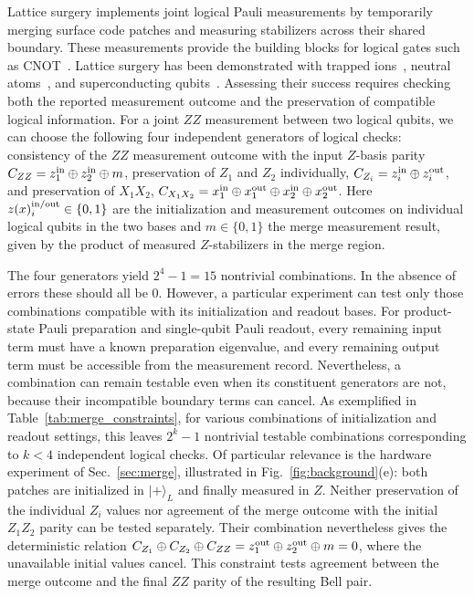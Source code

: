 \documentclass[aps,prxquantum,twocolumn,superscriptaddress,nofootinbib]{revtex4-2}
\begin{document}
Lattice surgery implements joint logical Pauli measurements by temporarily merging surface code patches and measuring stabilizers across their shared boundary. These measurements provide the building blocks for logical gates such as CNOT~\cite{horsman2012lattice,fowler2019lowoverheadquantumcomputation, Litinski_2018, Litinski_2019, bodeker2026lattice}. Lattice surgery has been demonstrated with trapped ions~\cite{erhard2021entangling,steiner2026genuine}, neutral atoms~\cite{bluvstein2025architectural}, and superconducting qubits~\cite{besedin2026lattice,lacroix2025color,wang2026surgery,lin2026logical}. Assessing their success requires checking both the reported measurement outcome and the preservation of compatible logical information. For a joint $ZZ$ measurement between two logical qubits, we can choose the following four independent generators of logical checks: consistency of the $ZZ$ measurement outcome with the input $Z$-basis parity $C_{ZZ}=z_1^{\rm in}\oplus z_2^{\rm in}\oplus m$, preservation of $Z_1$ and $Z_2$ individually, $C_{Z_i}=z_i^{\rm in}\oplus z_i^{\rm out}$, and preservation of $X_1X_2$, $C_{X_1X_2}=x_1^{\rm in}\oplus x_1^{\rm out}\oplus x_2^{\rm in}\oplus x_2^{\rm out}$. Here $z(x)_i^{\rm in/out}\in \{0,1\}$ are the initialization and measurement outcomes on individual logical qubits in the two bases and $m\in \{0,1\}$ the merge measurement result, given by the product of measured $Z$-stabilizers in the merge region. 

The four generators yield $2^4-1=15$ nontrivial combinations. In the absence of errors these should all be 0. However, a particular experiment can test only those combinations compatible with its initialization and readout bases.  For product-state Pauli preparation and single-qubit Pauli readout, every remaining input term must have a known preparation eigenvalue, and every remaining output term must be accessible from the measurement record. Nevertheless, a combination can remain testable even when its constituent generators are not, because their incompatible boundary terms can cancel. As exemplified in Table~\ref{tab:merge_constraints}, for various combinations of initialization and readout settings, this leaves $2^k-1$ nontrivial testable combinations corresponding to $k<4$ independent logical checks. Of particular relevance is the hardware experiment of Sec.~\ref{sec:merge}, illustrated in Fig.~\ref{fig:background}(e): both patches are initialized in $|+\rangle_L$ and finally measured in $Z$. Neither preservation of the individual $Z_i$ values nor agreement of the merge outcome with the initial $Z_1Z_2$ parity can be tested separately. Their combination nevertheless gives the deterministic relation $C_{Z_1}\oplus C_{Z_2}\oplus C_{ZZ}=z_1^{\rm out}\oplus z_2^{\rm out}\oplus m=0$, where the unavailable initial values cancel. This constraint tests agreement between the merge outcome and the final $ZZ$ parity of the resulting Bell pair.
\end{document}
